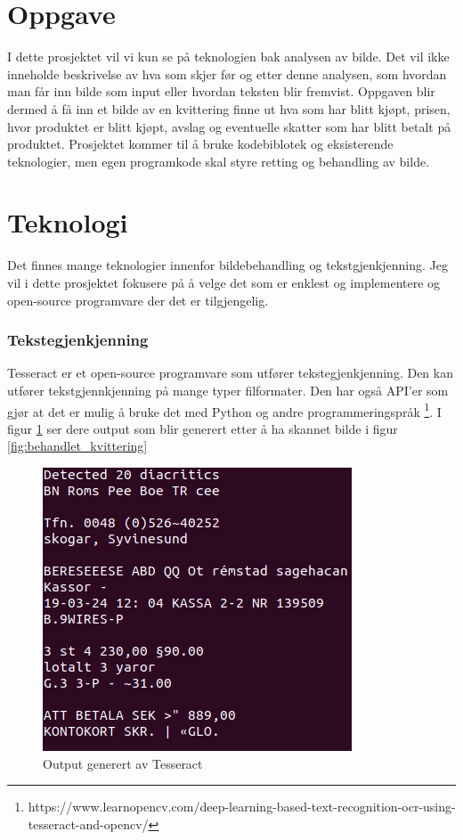 \documentclass{article}
\begin{document}
\section{Oppgave}
I dette prosjektet vil vi kun se på teknologien bak analysen av bilde. Det vil ikke inneholde beskrivelse av hva som skjer før og etter denne analysen, som hvordan man får inn bilde som input eller hvordan teksten blir fremvist. Oppgaven blir dermed å få inn et bilde av en kvittering finne ut hva som har blitt kjøpt, prisen, hvor produktet er blitt kjøpt, avslag og eventuelle skatter som har blitt betalt på produktet. Prosjektet kommer til å bruke kodebiblotek og eksisterende teknologier, men egen programkode skal styre retting og behandling av bilde.

\section{Teknologi}
Det finnes mange teknologier innenfor bildebehandling og tekstgjenkjenning. Jeg vil i dette prosjektet fokusere på å velge det som er enklest og implementere og open-source programvare der det er tilgjengelig.
\subsubsection{Tekstegjenkjenning}
Tesseract er et open-source programvare som utfører tekstegjenkjenning. Den kan utfører tekstgjennkjenning på mange typer filformater. Den har også API'er som gjør at det er mulig å bruke det med Python og andre programmeringspråk \footnote{https://www.learnopencv.com/deep-learning-based-text-recognition-ocr-using-tesseract-and-opencv/}. I figur \ref{fig:tesseract_output} ser dere output som blir generert etter å ha skannet bilde i figur \ref{fig:behandlet_kvittering}

\begin{figure}[h]
\centering
\includegraphics[scale=0.5]{images/output.png}
\caption{Output generert av Tesseract}
\label{fig:tesseract_output}
\end{figure}
\end{document}
